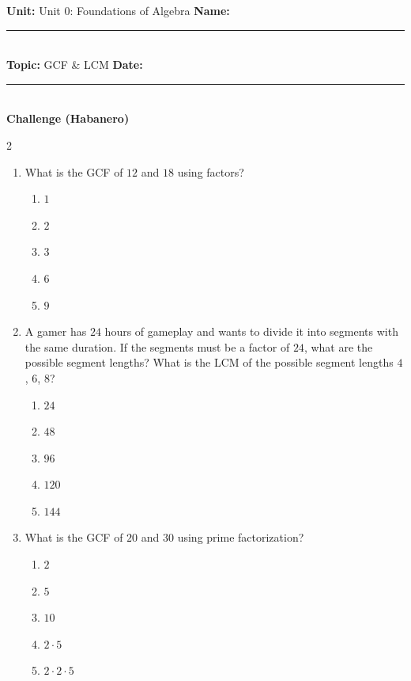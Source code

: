 \documentclass[10pt]{article}
\begin{document}
\enlargethispage{2.5cm}

\begin{tcolorbox}[colback=mainblue!5, colframe=mainblue, sharp corners, boxrule=0.5pt]
    \small \textbf{Unit:} Unit 0: Foundations of Algebra \hfill \textbf{Name:} \rule{3cm}{0.4pt} \\
    \small \textbf{Topic:} GCF & LCM \hfill \textbf{Date:} \rule{2cm}{0.4pt} \\
    \centering \textbf{\large Challenge (Habanero)}
\end{tcolorbox}

\vspace{0.2cm}

\begin{multicols}{2}
\begin{enumerate}[label=\textbf{Q\arabic*.}, leftmargin=*, itemsep=6pt, parsep=0pt]

  \item \small What is the GCF of $12$ and $18$ using factors?
  \begin{enumerate}[label=(\Alph*), leftmargin=0.6cm, nosep, itemsep=2pt]
    \item $1$
    \item $2$
    \item $3$
    \item $6$
    \item $9$
  \end{enumerate}

  \item \small A gamer has $24$ hours of gameplay and wants to divide it into segments with the same duration. If the segments must be a factor of $24$, what are the possible segment lengths? What is the LCM of the possible segment lengths $4$, $6$, $8$?
  \begin{enumerate}[label=(\Alph*), leftmargin=0.6cm, nosep, itemsep=2pt]
    \item $24$
    \item $48$
    \item $96$
    \item $120$
    \item $144$
  \end{enumerate}

  \item \small What is the GCF of $20$ and $30$ using prime factorization?
  \begin{enumerate}[label=(\Alph*), leftmargin=0.6cm, nosep, itemsep=2pt]
    \item $2$
    \item $5$
    \item $10$
    \item $2 \cdot 5$
    \item $2 \cdot 2 \cdot 5$
  \end{enumerate}


\end{enumerate}
\end{multicols}
\end{document}
